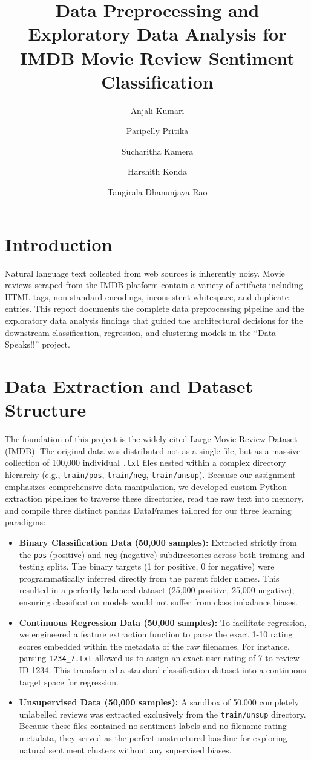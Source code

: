 \documentclass[12pt]{article}
\title{\textbf{Data Preprocessing and Exploratory Data Analysis for IMDB Movie Review Sentiment Classification}}
\author{Anjali Kumari}
\author{Paripelly Pritika}
\author{Sucharitha Kamera}
\author{Harshith Konda}
\author{Tangirala Dhanunjaya Rao}
\affil{Data Speaks!! Course Assignment}
\date{}
\begin{document}
\maketitle

\section*{Introduction}
Natural language text collected from web sources is inherently noisy. Movie reviews scraped from the IMDB platform contain a variety of artifacts including HTML tags, non-standard encodings, inconsistent whitespace, and duplicate entries. This report documents the complete data preprocessing pipeline and the exploratory data analysis findings that guided the architectural decisions for the downstream classification, regression, and clustering models in the ``Data Speaks!!'' project.

\section*{Data Extraction and Dataset Structure}
The foundation of this project is the widely cited Large Movie Review Dataset (IMDB). The original data was distributed not as a single file, but as a massive collection of 100,000 individual \texttt{.txt} files nested within a complex directory hierarchy (e.g., \texttt{train/pos}, \texttt{train/neg}, \texttt{train/unsup}). Because our assignment emphasizes comprehensive data manipulation, we developed custom Python extraction pipelines to traverse these directories, read the raw text into memory, and compile three distinct pandas DataFrames tailored for our three learning paradigms:

\begin{itemize}
    \item \textbf{Binary Classification Data (50,000 samples):} Extracted strictly from the \texttt{pos} (positive) and \texttt{neg} (negative) subdirectories across both training and testing splits. The binary targets (1 for positive, 0 for negative) were programmatically inferred directly from the parent folder names. This resulted in a perfectly balanced dataset (25,000 positive, 25,000 negative), ensuring classification models would not suffer from class imbalance biases.
    \item \textbf{Continuous Regression Data (50,000 samples):} To facilitate regression, we engineered a feature extraction function to parse the exact 1-10 rating scores embedded within the metadata of the raw filenames. For instance, parsing \texttt{1234\_7.txt} allowed us to assign an exact user rating of 7 to review ID 1234. This transformed a standard classification dataset into a continuous target space for regression.
    \item \textbf{Unsupervised Data (50,000 samples):} A sandbox of 50,000 completely unlabelled reviews was extracted exclusively from the \texttt{train/unsup} directory. Because these files contained no sentiment labels and no filename rating metadata, they served as the perfect unstructured baseline for exploring natural sentiment clusters without any supervised biases.
\end{itemize}
\end{document}
